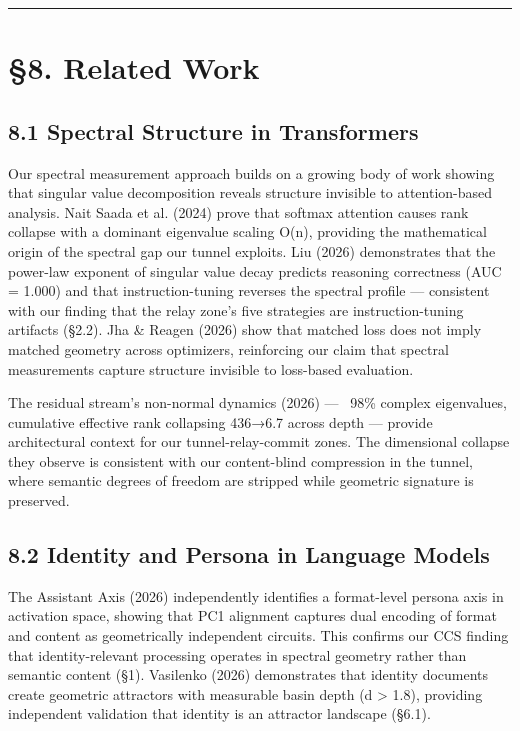 \documentclass[12pt]{article}
\begin{document}
\bigskip\hrule\bigskip

\section*{§8. Related Work}

\subsection*{8.1 Spectral Structure in Transformers}

Our spectral measurement approach builds on a growing body of work showing that singular value decomposition reveals structure invisible to attention-based analysis. Nait Saada et al. (2024) prove that softmax attention causes rank collapse with a dominant eigenvalue scaling O(n), providing the mathematical origin of the spectral gap our tunnel exploits. Liu (2026) demonstrates that the power-law exponent of singular value decay predicts reasoning correctness (AUC = 1.000) and that instruction-tuning reverses the spectral profile — consistent with our finding that the relay zone's five strategies are instruction-tuning artifacts (§2.2). Jha \& Reagen (2026) show that matched loss does not imply matched geometry across optimizers, reinforcing our claim that spectral measurements capture structure invisible to loss-based evaluation.

The residual stream's non-normal dynamics (2026) — ~98\% complex eigenvalues, cumulative effective rank collapsing 436→6.7 across depth — provide architectural context for our tunnel-relay-commit zones. The dimensional collapse they observe is consistent with our content-blind compression in the tunnel, where semantic degrees of freedom are stripped while geometric signature is preserved.

\subsection*{8.2 Identity and Persona in Language Models}

The Assistant Axis (2026) independently identifies a format-level persona axis in activation space, showing that PC1 alignment captures dual encoding of format and content as geometrically independent circuits. This confirms our CCS finding that identity-relevant processing operates in spectral geometry rather than semantic content (§1). Vasilenko (2026) demonstrates that identity documents create geometric attractors with measurable basin depth (d > 1.8), providing independent validation that identity is an attractor landscape (§6.1).
\end{document}
